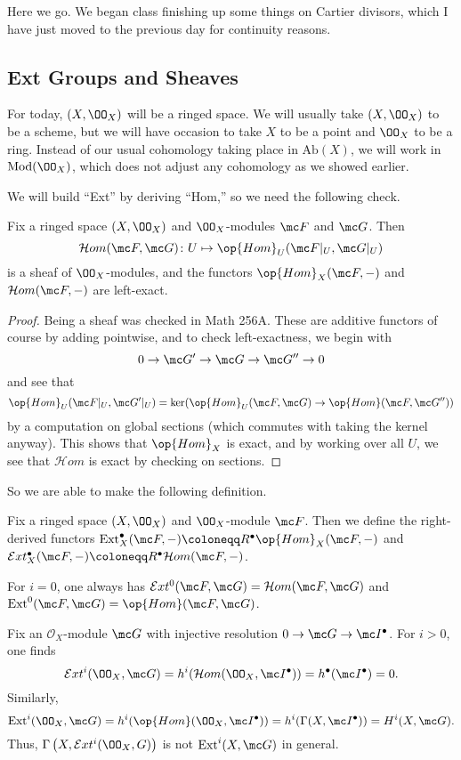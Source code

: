 \documentclass[../notes.tex]{subfiles}
\begin{document}
Here we go. We began class finishing up some things on Cartier divisors, which I have just moved to the previous day for continuity reasons.

\subsection{Ext Groups and Sheaves}
For today, $(X,\OO_X)$ will be a ringed space. We will usually take $(X,\OO_X)$ to be a scheme, but we will have occasion to take $X$ to be a point and $\OO_X$ to be a ring. Instead of our usual cohomology taking place in $\mathrm{Ab}(X)$, we will work in $\mathrm{Mod}(\OO_X)$, which does not adjust any cohomology as we showed earlier.

We will build ``Ext'' by deriving ``Hom,'' so we need the following check.
\begin{proposition}
	Fix a ringed space $(X,\OO_X)$ and $\OO_X$-modules $\mc F$ and $\mc G$. Then
	\[\mathcal Hom(\mc F,\mc G)\colon U\mapsto\op{Hom}_U(\mc F|_U,\mc G|_U)\]
	is a sheaf of $\OO_X$-modules, and the functors $\op{Hom}_X(\mc F,-)$ and $\mathcal Hom(\mc F,-)$ are left-exact.
\end{proposition}
\begin{proof}
	Being a sheaf was checked in Math 256A. These are additive functors of course by adding pointwise, and to check left-exactness, we begin with
	\[0\to\mc G'\to\mc G\to\mc G''\to0\]
	and see that
	\[\op{Hom}_U(\mc F|_U,\mc G'|_U)=\ker(\op{Hom}_U(\mc F,\mc G)\to\op{Hom}(\mc F,\mc G''))\]
	by a computation on global sections (which commutes with taking the kernel anyway). This shows that $\op{Hom}_X$ is exact, and by working over all $U$, we see that $\mathcal Hom$ is exact by checking on sections.
\end{proof}
So we are able to make the following definition.
\begin{definition}[Ext]
	Fix a ringed space $(X,\OO_X)$ and $\OO_X$-module $\mc F$. Then we define the right-derived functors $\mathrm{Ext}^\bullet_X(\mc F,-)\coloneqq R^\bullet\op{Hom}_X(\mc F,-)$ and $\mathcal Ext^\bullet_X(\mc F,-)\coloneqq R^\bullet\mathcal Hom(\mc F,-)$.
\end{definition}
\begin{example}
	For $i=0$, one always has $\mathcal Ext^0(\mc F,\mc G)=\mathcal Hom(\mc F,\mc G)$ and $\mathrm{Ext}^0(\mc F,\mc G)=\op{Hom}(\mc F,\mc G)$.
\end{example}
\begin{example}
	Fix an $\mathcal O_X$-module $\mc G$ with injective resolution $0\to\mc G\to\mc I^\bullet$. For $i>0$, one finds
	\[\mathcal Ext^i(\OO_X,\mc G)=h^i(\mathcal Hom(\OO_X,\mc I^\bullet))=h^\bullet(\mc I^\bullet)=0.\]
	Similarly,
	\[\mathrm{Ext}^i(\OO_X,\mc G)=h^i(\op{Hom}(\OO_X,\mc I^\bullet))=h^i(\Gamma(X,\mc I^\bullet))=H^i(X,\mc G).\]
	Thus, $\Gamma\left(X,\mathcal Ext^i(\OO_X,G)\right)$ is not $\mathrm{Ext}^i(X,\mc G)$ in general.
\end{example}
\end{document}
